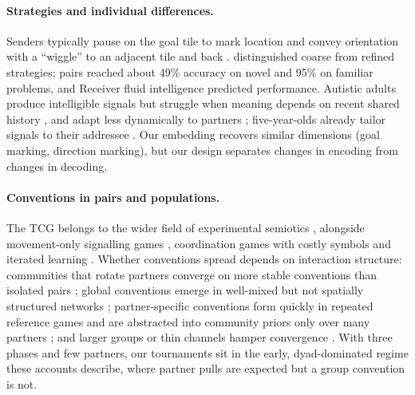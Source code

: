 \paragraph{Strategies and individual differences.} Senders typically pause on the goal tile to mark location and convey orientation with a ``wiggle'' to an adjacent tile and back \citep{blokpoel2012}. \citet{volman2012} distinguished coarse from refined strategies; pairs reached about 49\% accuracy on novel and 95\% on familiar problems, and Receiver fluid intelligence predicted performance. Autistic adults produce intelligible signals but struggle when meaning depends on recent shared history \citep{wadge2019}, and adapt less dynamically to partners \citep{koch2026}; five-year-olds already tailor signals to their addressee \citep{stolk2013b}. Our embedding recovers similar dimensions (goal marking, direction marking), but our design separates changes in encoding from changes in decoding.

\paragraph{Conventions in pairs and populations.} The TCG belongs to the wider field of experimental semiotics \citep{galantucci2005,galantucci2011}, alongside movement-only signalling games \citep{scottphillips2009}, coordination games with costly symbols \citep{selten2007} and iterated learning \citep{kirby2008}. Whether conventions spread depends on interaction structure: communities that rotate partners converge on more stable conventions than isolated pairs \citep{garrod1994}; global conventions emerge in well-mixed but not spatially structured networks \citep{centola2015}; partner-specific conventions form quickly in repeated reference games \citep{hawkins2020} and are abstracted into community priors only over many partners \citep{hawkins2023,hawkins2019}; and larger groups or thin channels hamper convergence \citep{boyce2024}. With three phases and few partners, our tournaments sit in the early, dyad-dominated regime these accounts describe, where partner pulls are expected but a group convention is not.

